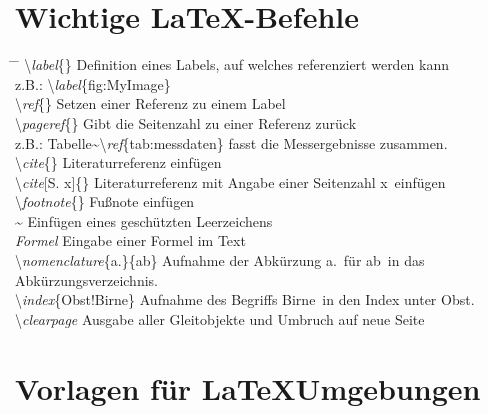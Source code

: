 \setcounter{chapter}{5}
\setcounter{section}{0}
\setcounter{table}{0}
\setcounter{figure}{0}

\section{Wichtige \LaTeX -Befehle}

\begin{tabbing}
\hspace*{0cm} \= \hspace{0.25\linewidth} \= \+\kill
\textbackslash \textit{label}\{\}	\> Definition eines Labels, auf welches referenziert werden kann\\ 
	\> z.B.: \textbackslash \textit{label}\{fig:MyImage\}\\ 
\textbackslash \textit{ref}\{\}	\> Setzen einer Referenz zu einem Label\\
\textbackslash \textit{pageref}\{\}	\> Gibt die Seitenzahl zu einer Referenz zurück\\
	\> z.B.: Tabelle\~{}\textbackslash \textit{ref}\{tab:messdaten\} fasst die Messergebnisse zusammen.\\ 
\textbackslash \textit{cite}\{\}	\> Literaturreferenz einfügen\\
\textbackslash \textit{cite}[S. x]\{\}	\> Literaturreferenz mit Angabe einer Seitenzahl \glqq x\grqq~einfügen\\

\textbackslash \textit{footnote}\{\}	\> Fußnote einfügen\\ 
\~{}	\> Einfügen eines geschützten Leerzeichens\\ 
\textdollar \textit{Formel} \textdollar	\> Eingabe einer Formel im Text\\
\textbackslash \textit{nomenclature}\{a.\}\{ab\}	\> Aufnahme der Abkürzung \glqq a.\grqq~für \glqq ab\grqq~in das Abkürzungsverzeichnis.\\
\textbackslash \textit{index}\{Obst!Birne\} \> Aufnahme des Begriffs \glqq Birne\grqq~in den Index unter \glqq Obst\grqq.  \\
\textbackslash \textit{clearpage}	\> Ausgabe aller Gleitobjekte und Umbruch auf neue Seite\\ 
\end{tabbing}

\clearpage

\section{Vorlagen für \LaTeX Umgebungen}

